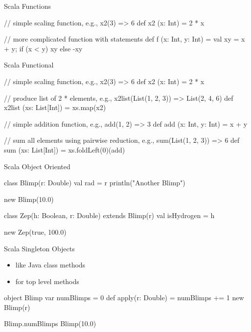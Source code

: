 \begin{frame}[fragile]{Scala Functions}
\begin{scala}
// simple scaling function, e.g., x2(3) => 6
def x2 (x: Int) = 2 * x
\end{scala}

\begin{scala}
// more complicated function with statements
def f (x: Int, y: Int) = {
  val xy = x + y;
  if (x < y) xy else -xy
}
\end{scala}
\end{frame}

\begin{frame}[fragile]{Scala Functional}
\begin{scala}
// simple scaling function, e.g., x2(3) => 6
def x2 (x: Int) = 2 * x
\end{scala}

\begin{scala}
// produce list of 2 * elements, e.g., x2list(List(1, 2, 3)) => List(2, 4, 6)
def x2list (xs: List[Int]) = xs.map(x2)
\end{scala}

\begin{scala}
// simple addition function, e.g., add(1, 2) => 3
def add (x: Int, y: Int) = x + y
\end{scala}

\begin{scala}
// sum all elements using pairwise reduction, e.g., sum(List(1, 2, 3)) => 6
def sum (xs: List[Int]) = xs.foldLeft(0)(add)
\end{scala}
\end{frame}

\begin{frame}[fragile]{Scala Object Oriented}

\begin{scala}
class Blimp(r: Double) {
  val rad = r
  println("Another Blimp")
}

new Blimp(10.0)
\end{scala}

\begin{scala}
class Zep(h: Boolean, r: Double) extends Blimp(r) {
  val isHydrogen = h
}

new Zep(true, 100.0)
\end{scala}

\end{frame}

\begin{frame}[fragile]{Scala Singleton Objects}

\begin{itemize}
\item like Java class methods
\item for top level methods
\end{itemize}
\begin{scala}
object Blimp {
  var numBlimps = 0
  def apply(r: Double) = {
    numBlimps += 1
    new Blimp(r)
  }
}

Blimp.numBlimps
Blimp(10.0)
\end{scala}

\end{frame}


